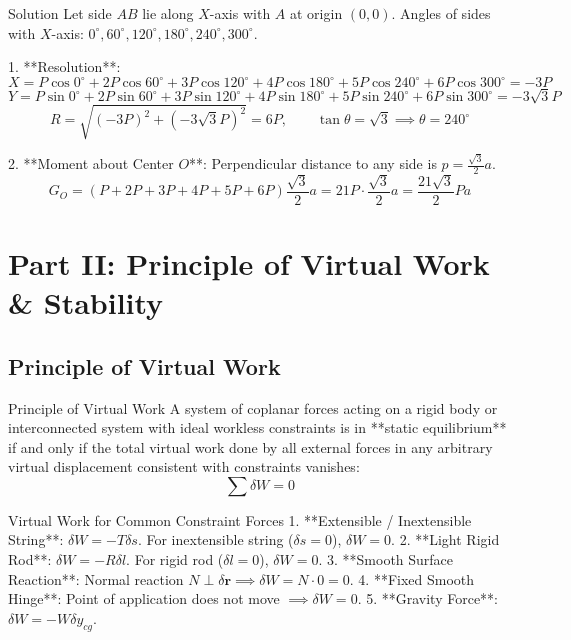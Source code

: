 \documentclass[11pt,a4paper]{article}
\begin{document}
\begin{proofbox}{Solution}
Let side $AB$ lie along $X$-axis with $A$ at origin $(0,0)$.
Angles of sides with $X$-axis: $0^\circ, 60^\circ, 120^\circ, 180^\circ, 240^\circ, 300^\circ$.

1. **Resolution**:
\[
X = P\cos 0^\circ + 2P\cos 60^\circ + 3P\cos 120^\circ + 4P\cos 180^\circ + 5P\cos 240^\circ + 6P\cos 300^\circ = -3P
\]
\[
Y = P\sin 0^\circ + 2P\sin 60^\circ + 3P\sin 120^\circ + 4P\sin 180^\circ + 5P\sin 240^\circ + 6P\sin 300^\circ = -3\sqrt{3}P
\]
\[
R = \sqrt{(-3P)^2 + (-3\sqrt{3}P)^2} = 6P, \qquad \tan\theta = \sqrt{3} \implies \theta = 240^\circ
\]

2. **Moment about Center $O$**:
Perpendicular distance to any side is $p = \frac{\sqrt{3}}{2}a$.
\[
G_O = (P + 2P + 3P + 4P + 5P + 6P) \frac{\sqrt{3}}{2}a = 21P \cdot \frac{\sqrt{3}}{2}a = \frac{21\sqrt{3}}{2}Pa
\]
\end{proofbox}

\section{Part II: Principle of Virtual Work \& Stability}

\subsection{Principle of Virtual Work}

\begin{theorembox}{Principle of Virtual Work}
A system of coplanar forces acting on a rigid body or interconnected system with ideal workless constraints is in **static equilibrium** if and only if the total virtual work done by all external forces in any arbitrary virtual displacement consistent with constraints vanishes:
\begin{equation}
\sum \delta W = 0
\end{equation}
\end{theorembox}

\begin{proofbox}{Virtual Work for Common Constraint Forces}
1. **Extensible / Inextensible String**: $\delta W = -T \delta s$. For inextensible string ($\delta s = 0$), $\delta W = 0$.
2. **Light Rigid Rod**: $\delta W = -R \delta l$. For rigid rod ($\delta l = 0$), $\delta W = 0$.
3. **Smooth Surface Reaction**: Normal reaction $N \perp \delta \mathbf{r} \implies \delta W = N \cdot 0 = 0$.
4. **Fixed Smooth Hinge**: Point of application does not move $\implies \delta W = 0$.
5. **Gravity Force**: $\delta W = -W \delta y_{cg}$.
\end{proofbox}
\end{document}
